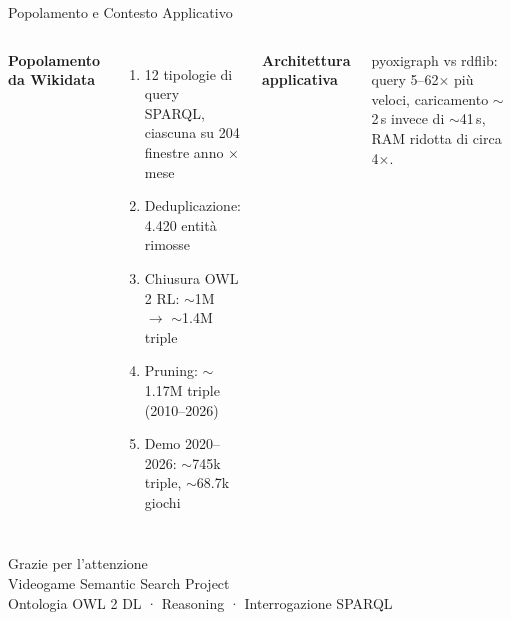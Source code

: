 \documentclass[aspectratio=169,11pt]{beamer}
\begin{document}
\begin{frame}{Popolamento e Contesto Applicativo}
  \begin{columns}[T]
    \textbf{Popolamento da Wikidata}
    \begin{enumerate}\small
      \item 12 tipologie di query SPARQL, ciascuna su 204 finestre anno $\times$ mese
      \item Deduplicazione: 4.420 entit\`a rimosse
      \item Chiusura OWL 2 RL: $\sim$1M $\to$ $\sim$1.4M triple
      \item Pruning: $\sim$1.17M triple (2010--2026)
      \item Demo 2020--2026: $\sim$745k triple, $\sim$68.7k giochi
    \end{enumerate}

    \textbf{Architettura applicativa}
    \vspace{2pt}


    \vspace{4pt}
    {\scriptsize pyoxigraph vs rdflib: query 5--62$\times$ pi\`u veloci, caricamento
    $\sim$2\,s invece di $\sim$41\,s, RAM ridotta di circa 4$\times$.}
  \end{columns}
\end{frame}

\begin{frame}[standout]
  \Huge Grazie per l'attenzione \\[12pt]
  \normalsize Videogame Semantic Search Project \\[6pt]
  \footnotesize Ontologia OWL 2 DL · Reasoning · Interrogazione SPARQL
\end{frame}
\end{document}
